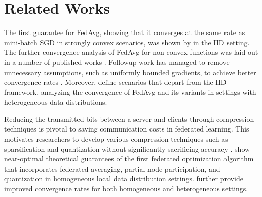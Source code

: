 \section{Related Works}

The first guarantee for FedAvg, showing that it converges at the same rate as mini-batch SGD in strongly convex scenarios, was shown by \cite{stich2018local} in the IID setting. The further convergence analysis of FedAvg for non-convex functions was laid out in a number of published works \cite{wang2018cooperative, haddadpour2019trading, yu2019parallel}. Followup work has managed to remove unnecessary assumptions, such as uniformly bounded gradients, to achieve better convergence rates \cite{wang2018cooperative, stich2019error, haddadpour2019local, khaled2020tighter, woodworth2020local}. Moreover, \cite{li2018federated, haddadpour2019convergence, li2019convergence, khaled2020tighter, karimireddy2020scaffold} define scenarios that depart from the IID framework, analyzing the convergence of FedAvg and its variants in settings with heterogeneous data distributions.

Reducing the transmitted bits between a server and clients through compression techniques is pivotal to saving communication costs in federated learning. This motivates researchers to develop various compression techniques such as sparsification and quantization without significantly sacrificing accuracy \cite{konevcny2016federated, alistarh2017qsgd, suresh2017distributed, wangni2017gradient, bernstein2018signsgd, wang2018atomo, vogels2019powersgd, horvath2019natural, basu2019qsparse, rothchild2020fetchsgd}. \cite{reisizadeh2020fedpaq} show near-optimal theoretical guarantees of the first federated optimization algorithm that incorporates federated averaging, partial node participation, and quantization in homogeneous local data distribution settings. \cite{haddadpour2021federated} further provide improved convergence rates for both homogeneous and heterogeneous settings.

